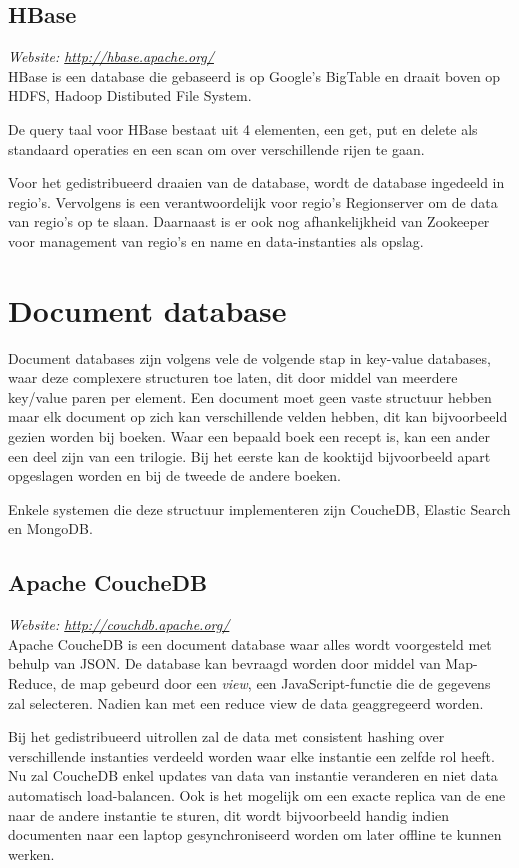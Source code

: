 \subsection{HBase}
\textit{Website: \url{http://hbase.apache.org/}}\\
HBase is een database die gebaseerd is op Google's BigTable en draait boven op HDFS, Hadoop Distibuted File System.

De query taal voor HBase bestaat uit 4 elementen, een get, put en delete als standaard operaties en een scan om over verschillende rijen te gaan. 

Voor het gedistribueerd draaien van de database, wordt de database ingedeeld in regio's. Vervolgens is een verantwoordelijk voor regio's  Regionserver om de data van regio's op te slaan. Daarnaast is er ook nog afhankelijkheid van Zookeeper voor management van regio's en name en data-instanties als opslag.  

\section{Document database}
Document databases zijn volgens vele de volgende stap in key-value databases, waar deze complexere structuren toe laten, dit door middel van meerdere key/value paren per element. 
Een document moet geen vaste structuur hebben maar elk document op zich kan verschillende velden hebben, dit kan bijvoorbeeld gezien worden bij boeken. Waar een bepaald boek een recept is, kan een ander een deel zijn van een trilogie. Bij het eerste kan de kooktijd bijvoorbeeld apart opgeslagen worden en bij de tweede de andere boeken. 

Enkele systemen die deze structuur implementeren zijn CoucheDB, Elastic Search en MongoDB. 

\subsection{Apache CoucheDB}
\textit{Website: \url{http://couchdb.apache.org/}}\\
Apache CoucheDB is een document database waar alles wordt voorgesteld met behulp van JSON. De database kan bevraagd worden door middel van Map-Reduce, de map gebeurd door een \textit{view}, een JavaScript-functie die de gegevens zal selecteren. Nadien kan met een reduce view de data geaggregeerd worden. 

Bij het gedistribueerd uitrollen zal de data met consistent hashing over verschillende instanties verdeeld worden waar elke instantie een zelfde rol heeft. Nu zal CoucheDB enkel updates van data van instantie veranderen en niet data automatisch load-balancen. Ook is het mogelijk om een exacte replica van de ene naar de andere instantie te sturen, dit wordt bijvoorbeeld handig indien documenten naar een laptop gesynchroniseerd worden om later offline te kunnen werken.

